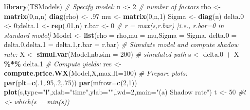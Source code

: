 \documentclass[
  12pt,
]{book}
\newenvironment{Shaded}{\begin{snugshade}}{\end{snugshade}}
\newcommand{\AttributeTok}[1]{\textcolor[rgb]{0.13,0.29,0.53}{#1}}
\newcommand{\CommentTok}[1]{\textcolor[rgb]{0.56,0.35,0.01}{\textit{#1}}}
\newcommand{\DecValTok}[1]{\textcolor[rgb]{0.00,0.00,0.81}{#1}}
\newcommand{\FloatTok}[1]{\textcolor[rgb]{0.00,0.00,0.81}{#1}}
\newcommand{\FunctionTok}[1]{\textcolor[rgb]{0.13,0.29,0.53}{\textbf{#1}}}
\newcommand{\NormalTok}[1]{#1}
\newcommand{\OtherTok}[1]{\textcolor[rgb]{0.56,0.35,0.01}{#1}}
\newcommand{\SpecialCharTok}[1]{\textcolor[rgb]{0.81,0.36,0.00}{\textbf{#1}}}
\newcommand{\StringTok}[1]{\textcolor[rgb]{0.31,0.60,0.02}{#1}}
\theoremstyle{definition}
\theoremstyle{definition}
\theoremstyle{definition}
\theoremstyle{definition}
\theoremstyle{remark}
\begin{document}
\begin{Shaded}
\begin{Highlighting}[]
\FunctionTok{library}\NormalTok{(TSModels)}
\CommentTok{\# Specify model:}
\NormalTok{n }\OtherTok{\textless{}{-}} \DecValTok{2} \CommentTok{\# number of factors}
\NormalTok{rho }\OtherTok{\textless{}{-}} \FunctionTok{matrix}\NormalTok{(}\DecValTok{0}\NormalTok{,n,n)}
\FunctionTok{diag}\NormalTok{(rho) }\OtherTok{\textless{}{-}}\NormalTok{ .}\DecValTok{97}
\NormalTok{mu }\OtherTok{\textless{}{-}} \FunctionTok{matrix}\NormalTok{(}\DecValTok{0}\NormalTok{,n,}\DecValTok{1}\NormalTok{)}
\NormalTok{Sigma }\OtherTok{\textless{}{-}} \FunctionTok{diag}\NormalTok{(n)}
\NormalTok{delta}\FloatTok{.0} \OtherTok{\textless{}{-}} \DecValTok{0}\NormalTok{;delta}\FloatTok{.1} \OtherTok{\textless{}{-}} \FunctionTok{rep}\NormalTok{(.}\DecValTok{01}\NormalTok{,n)}
\NormalTok{r.bar }\OtherTok{\textless{}{-}} \DecValTok{0} \CommentTok{\# r = max(s,r.bar) [i.e., r.bar=0 in standard model]}
\NormalTok{Model }\OtherTok{\textless{}{-}} \FunctionTok{list}\NormalTok{(}\AttributeTok{rho =}\NormalTok{ rho,}\AttributeTok{mu =}\NormalTok{ mu,}\AttributeTok{Sigma =}\NormalTok{ Sigma,}
              \AttributeTok{delta.0 =}\NormalTok{ delta}\FloatTok{.0}\NormalTok{,}\AttributeTok{delta.1 =}\NormalTok{ delta}\FloatTok{.1}\NormalTok{,}\AttributeTok{r.bar =}\NormalTok{ r.bar)}
\CommentTok{\# Simulate model and compute shadow rate:}
\NormalTok{X }\OtherTok{\textless{}{-}} \FunctionTok{simul.var}\NormalTok{(Model,}\AttributeTok{nb.sim =} \DecValTok{200}\NormalTok{) }\CommentTok{\# simulated path}
\NormalTok{s }\OtherTok{\textless{}{-}}\NormalTok{ delta}\FloatTok{.0} \SpecialCharTok{+}\NormalTok{ X }\SpecialCharTok{\%*\%}\NormalTok{ delta}\FloatTok{.1}
\CommentTok{\# Compute yields:}
\NormalTok{res }\OtherTok{\textless{}{-}} \FunctionTok{compute.price.WX}\NormalTok{(Model,X,}\AttributeTok{max.H=}\DecValTok{100}\NormalTok{)}
\CommentTok{\# Prepare plots:}
\FunctionTok{par}\NormalTok{(}\AttributeTok{plt=}\FunctionTok{c}\NormalTok{(.}\DecValTok{1}\NormalTok{,.}\DecValTok{95}\NormalTok{,.}\DecValTok{2}\NormalTok{,.}\DecValTok{75}\NormalTok{))}
\FunctionTok{par}\NormalTok{(}\AttributeTok{mfrow=}\FunctionTok{c}\NormalTok{(}\DecValTok{2}\NormalTok{,}\DecValTok{1}\NormalTok{))}
\FunctionTok{plot}\NormalTok{(s,}\AttributeTok{type=}\StringTok{"l"}\NormalTok{,}\AttributeTok{xlab=}\StringTok{"time"}\NormalTok{,}\AttributeTok{ylab=}\StringTok{""}\NormalTok{,}\AttributeTok{lwd=}\DecValTok{2}\NormalTok{,}\AttributeTok{main=}\StringTok{"(a) Shadow rate"}\NormalTok{)}
\NormalTok{t }\OtherTok{\textless{}{-}} \DecValTok{50} \CommentTok{\#t \textless{}{-} which(s==min(s))}

\end{Highlighting}
\end{Shaded}
\end{document}
